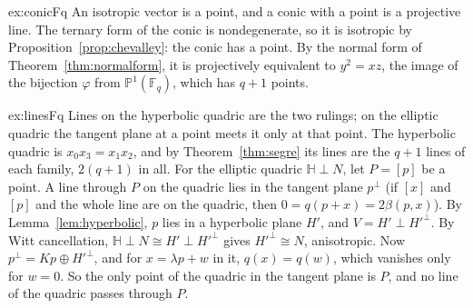 \begin{solution}{ex:conicFq}
\idea An isotropic vector is a point, and a conic with a point is a projective line.
\writeup The ternary form of the conic is nondegenerate, so it is isotropic by Proposition~\ref{prop:chevalley}: the conic has a point. By the normal
form of Theorem~\ref{thm:normalform}, it is projectively equivalent to $y^2=xz$, the image of the bijection $\varphi$ from $\mathbb P^1(\mathbb F_q)$,
which has $q+1$ points.
\end{solution}

\begin{solution}{ex:linesFq}
\idea Lines on the hyperbolic quadric are the two rulings; on the elliptic quadric the tangent plane at a point meets it only at that point.
\writeup The hyperbolic quadric is $x_0x_3=x_1x_2$, and by Theorem~\ref{thm:segre} its lines are the $q+1$ lines of each family, $2(q+1)$ in all. For the
elliptic quadric $\mathbb H\perp N$, let $P=[p]$ be a point. A line through $P$ on the quadric lies in the tangent plane $p^\perp$ (if $[x]$ and $[p]$ and
the whole line are on the quadric, then $0=q(p+x)=2\beta(p,x)$). By Lemma~\ref{lem:hyperbolic}, $p$ lies in a hyperbolic plane $H'$, and
$V=H'\perp H'^\perp$. By Witt cancellation, $\mathbb H\perp N\cong H'\perp H'^\perp$ gives $H'^\perp\cong N$, anisotropic. Now $p^\perp=Kp\oplus H'^\perp$, and for
$x=\lambda p+w$ in it, $q(x)=q(w)$, which vanishes only for $w=0$. So the only point of the quadric in the tangent plane is $P$, and no line of the
quadric passes through $P$.
\end{solution}

